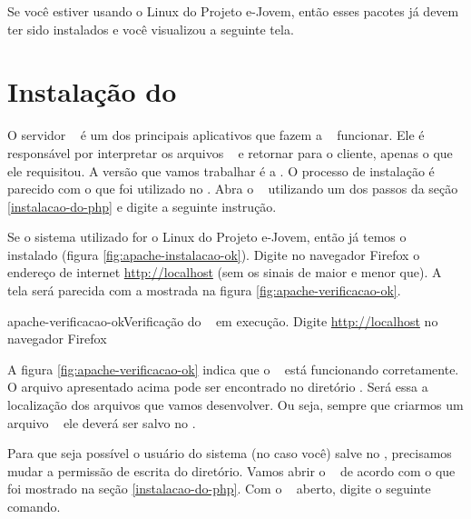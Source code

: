 Se você estiver usando o Linux do Projeto e-Jovem, então esses pacotes já devem
ter sido instalados e você visualizou a seguinte tela.


\section{Instalação do \apache}
\label{instalacao-do-apache}

O servidor \apache~ é um dos principais aplicativos que fazem a \web~ funcionar.
Ele é responsável por interpretar os arquivos \phpextensao~ e retornar para o
cliente, apenas o que ele requisitou. A versão que vamos trabalhar é a \apacheversao.
O processo de instalação é parecido com o que foi utilizado no \php. Abra o
\terminal~ utilizando um dos passos da seção \ref{instalacao-do-php} e digite a 
seguinte instrução.



Se o sistema utilizado for o Linux do Projeto e-Jovem, então já temos o \apache
\apacheversao~ instalado (figura \ref{fig:apache-instalacao-ok}). Digite no navegador 
Firefox o endereço de internet \url{http://localhost} (sem os sinais de maior e menor que). 
A tela será parecida com a mostrada na figura \ref{fig:apache-verificacao-ok}.

			{apache-verificacao-ok}{Verificação do \apache~ em execução. Digite \url{http://localhost} no navegador Firefox}

A figura \ref{fig:apache-verificacao-ok} indica que o \apache~ está funcionando corretamente.
O arquivo apresentado acima pode ser encontrado no diretório \dirpadrao. Será 
essa a localização dos arquivos que vamos desenvolver. Ou seja, sempre que criarmos
um arquivo \phpextensao~ ele deverá ser salvo no \dirpadrao. 

Para que seja possível o usuário do sistema (no caso você) salve no \dirpadrao,
precisamos mudar a permissão de escrita do diretório. Vamos abrir o \terminal~
de acordo com o que foi mostrado na seção \ref{instalacao-do-php}. Com o \terminal~
aberto, digite o seguinte comando.

